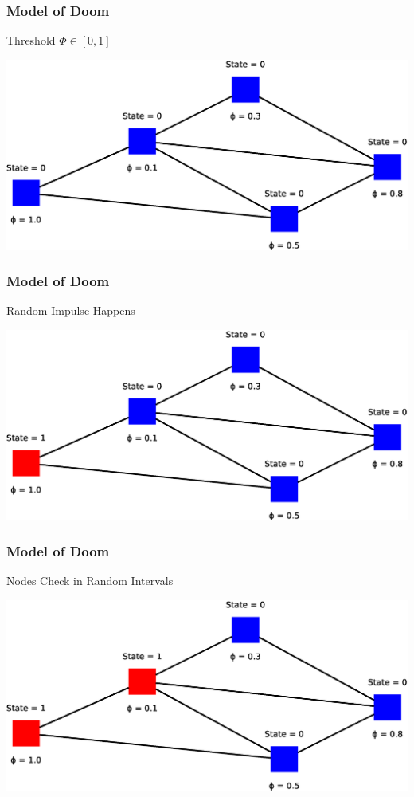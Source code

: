 \begin{frame}
    \frametitle{Model of Doom}
    \begin{itemize}
        \gitem Threshold $\Phi \in [0, 1]$
    \end{itemize}
    \vspace{8pt}
    \includegraphics[width=\textwidth]{img/model4}
    \vfill
\end{frame}

\begin{frame}
    \frametitle{Model of Doom}
    \begin{itemize}
        \gitem Random Impulse Happens
    \end{itemize}
    \vspace{8.6pt}
    \includegraphics[width=\textwidth]{img/model5}
    \vfill
\end{frame}

\begin{frame}
    \frametitle{Model of Doom}
    \begin{itemize}
        \gitem Nodes Check in Random Intervals
    \end{itemize}
    \vspace{10.8pt}
    \includegraphics[width=\textwidth]{img/model6}
    \vfill
\end{frame}

